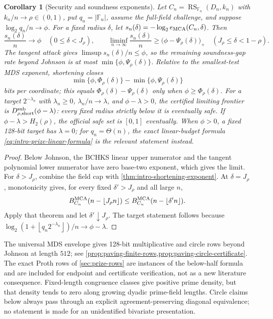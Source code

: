 \documentclass[11pt,a4paper]{amsart}
\numberwithin{equation}{section}
\newtheorem{corollary}[corollary]{Corollary}
\theoremstyle{remark}
\DeclareMathOperator{\RS}{RS}
\newcommand{\F}{\mathbb F}
\newcommand{\abs}[1]{\lvert #1\rvert}
\newcommand{\floor}[1]{\left\lfloor #1\right\rfloor}
\begin{document}
\begin{corollary}[Security and soundness exponents]
\label{cor:intro-security-exponents}
Let \(C_n=\RS_{\F_n}(D_n,k_n)\) with \(k_n/n\to\rho\in(0,1)\), put
\(q_n=\abs{\F_n}\), assume the full-field challenge, and suppose
\(\log_2 q_n/n\to\phi\).  For a fixed radius \(\delta\), let
\(s_n(\delta)=-\log_2 e_{\rm MCA}(C_n,\delta)\).  Then
\[
 \frac{s_n(\delta)}n\longrightarrow\phi
 \quad(0\le\delta<J_\rho),\qquad
 \liminf_{n\to\infty}\frac{s_n(\delta)}n
 \ge\bigl(\phi-\Psi_\rho(\delta)\bigr)_+
 \quad(J_\rho\le\delta<1-\rho).                   \tag{1.15}
 \label{eq:intro-security-exponents}
\]
The tangent attack gives \(\limsup s_n(\delta)/n\le\phi\), so the
remaining soundness-gap rate beyond Johnson is at most
\(\min\{\phi,\Psi_\rho(\delta)\}\).  Relative to the smallest-test MDS
exponent, shortening closes
\[
 \min\{\phi,\Phi_\rho(\delta)\}
 -\min\{\phi,\Psi_\rho(\delta)\}
\]
bits per coordinate; this equals
\(\Phi_\rho(\delta)-\Psi_\rho(\delta)\) only when
\(\phi\ge\Phi_\rho(\delta)\).  For a target
\(2^{-\lambda_n}\) with \(\lambda_n\ge0\),
\(\lambda_n/n\to\lambda\), and
\(\phi-\lambda>0\), the certified limiting frontier is
\(D_{\rho,\mathrm{short}}^{\rm sub}(\phi-\lambda)\): every fixed radius
strictly below it is
eventually safe.  If \(\phi-\lambda>H_2(\rho)\), the official safe set is
\([0,1]\) eventually.  When \(\phi>0\), a fixed 128-bit target has
\(\lambda=0\); for \(q_n=\Theta(n)\), the exact linear-budget formula
\eqref{eq:intro-prize-linear-formula} is the relevant statement instead.
\end{corollary}

\begin{proof}
Below Johnson, the BCHKS linear upper numerator and the tangent polynomial
lower numerator have zero base-two exponent, which gives the limit.  For
\(\delta>J_\rho\), combine the field cap with
\cref{thm:intro-shortening-exponent}.  At \(\delta=J_\rho\), monotonicity
gives, for every fixed \(\delta'>J_\rho\) and all large \(n\),
\[
 B_{C_n}^{\rm MCA}(n-\floor{J_\rho n})
 \le B_{C_n}^{\rm MCA}(n-\floor{\delta'n}).
\]
Apply that theorem and let
\(\delta'\downarrow J_\rho\).  The target statement follows because
\(\log_2(1+\floor{q_n2^{-\lambda_n}})/n\to\phi-\lambda\).
\end{proof}

The universal MDS envelope gives 128-bit multiplicative and circle rows
beyond Johnson at length \(512\); see
\cref{prop:paving-finite-rows,prop:paving-circle-certificate}.
The exact Proth rows of
\cref{sec:prize-rows} are instances of the below-half formula and are
included for endpoint and certificate verification, not as a new
literature consequence.  Fixed-length congruence classes give positive
prime density, but that density tends to zero along growing dyadic
prime-field lengths.  Circle claims below always pass through an explicit
agreement-preserving diagonal equivalence; no statement is made for an
unidentified bivariate presentation.
\end{document}
